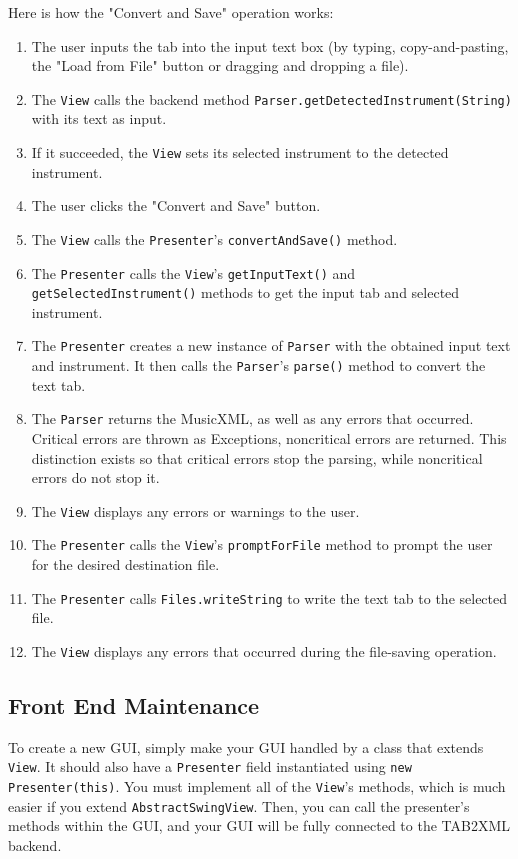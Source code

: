 \documentclass[11pt]{article}
\begin{document}
Here is how the "Convert and Save" operation works:
\begin{enumerate}
\item The user inputs the tab into the input text box (by typing, copy-and-pasting, the "Load from File" button or dragging and dropping a file).
\item The \texttt{View} calls the backend method \texttt{Parser.getDetectedInstrument(String)} with its text as input.
\item If it succeeded, the \texttt{View} sets its selected instrument to the detected instrument.
\item The user clicks the "Convert and Save" button.
\item The \texttt{View} calls the \texttt{Presenter}'s \texttt{convertAndSave()} method.
\item The \texttt{Presenter} calls the \texttt{View}'s \texttt{getInputText()} and \texttt{getSelectedInstrument()} methods to get the input tab and selected instrument.
\item The \texttt{Presenter} creates a new instance of \texttt{Parser} with the obtained input text and instrument.  It then calls the \texttt{Parser}'s \texttt{parse()} method to convert the text tab.
\item The \texttt{Parser} returns the MusicXML, as well as any errors that occurred.  Critical errors are thrown as Exceptions, noncritical errors are returned.  This distinction exists so that critical errors stop the parsing, while noncritical errors do not stop it.
\item The \texttt{View} displays any errors or warnings to the user.
\item The \texttt{Presenter} calls the \texttt{View}'s \texttt{promptForFile} method to prompt the user for the desired destination file.
\item The \texttt{Presenter} calls \texttt{Files.writeString} to write the text tab to the selected file.
\item The \texttt{View} displays any errors that occurred during the file-saving operation.
\end{enumerate}
\subsection{Front End Maintenance}
\label{sec:org0fd0f1b}
To create a new GUI, simply make your GUI handled by a class that extends \texttt{View}.  It should also have a \texttt{Presenter} field instantiated using \texttt{new Presenter(this)}.  You must implement all of the \texttt{View}'s methods, which is much easier if you extend \texttt{AbstractSwingView}.  Then, you can call the presenter's methods within the GUI, and your GUI will be fully connected to the TAB2XML backend.
\end{document}
